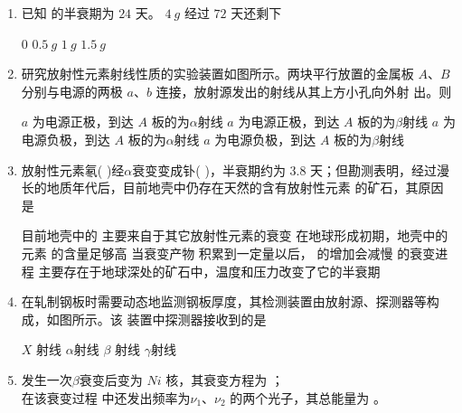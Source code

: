 \begin{enumerate}
\item 
{}
已知  的半衰期为 $ 24 $ 天。 $ 4 \ g $  经过 $ 72 $ 天还剩下   

\fourchoices
{$ 0 $ }
{$ 0.5 \ g $}
{$ 1 \ g $ }
{$ 1.5 \ g $}


\item 
{}
研究放射性元素射线性质的实验装置如图所示。两块平行放置的金属板 $ A $、$ B $
分别与电源的两极 $ a $、$ b $ 连接，放射源发出的射线从其上方小孔向外射
出。则  
\begin{figure}[h!]
	\centering
	
\end{figure}


\fourchoices
{$ a $ 为电源正极，到达 $ A $ 板的为$ \alpha $射线}
{$ a $ 为电源正极，到达 $ A $ 板的为$ \beta $射线}
{$ a $ 为电源负极，到达 $ A $ 板的为$ \alpha $射线}
{$ a $ 为电源负极，到达 $ A $ 板的为$ \beta $射线}



\item 
{}
放射性元素氡(  )经$ \alpha $衰变变成钋(  )，半衰期约为 $ 3.8 $ 天；但勘测表明，经过漫
长的地质年代后，目前地壳中仍存在天然的含有放射性元素  的矿石，其原因是  


\fourchoices
{目前地壳中的  主要来自于其它放射性元素的衰变}
{在地球形成初期，地壳中的元素  的含量足够高}
{当衰变产物  积累到一定量以后， 的增加会减慢  的衰变进程}
{ 主要存在于地球深处的矿石中，温度和压力改变了它的半衰期}


\item 
{}
在轧制钢板时需要动态地监测钢板厚度，其检测装置由放射源、探测器等构成，如图所示。该
装置中探测器接收到的是  
\begin{figure}[h!]
	\centering
	
\end{figure}


\fourchoices
{$ X $ 射线}
{$ \alpha $射线}
{$ \beta $ 射线}
{$ \gamma $射线}


\item 
{}
  发生一次$ \beta $衰变后变为 $ Ni $ 核，其衰变方程为 \hfullline ；\\
 在该衰变过程
中还发出频率为$ \nu _{1} $、$ \nu _{2} $ 的两个光子，其总能量为 \underlinegap 。



\end{enumerate}
